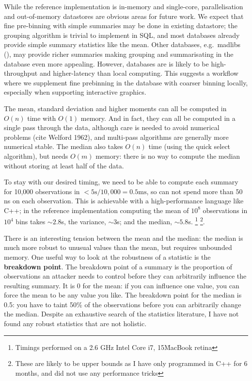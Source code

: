 \documentclass[journal]{vgtc}                %
\begin{document}
While the reference implementation is in-memory and single-core, parallelisation and out-of-memory datastores are obvious areas for  future work. We expect that fine pre-binning with simple summaries may be done in existing datastore; the grouping algorithm is trivial to implement in SQL, and most databases already provide simple summary statistics like the mean. Other databases, e.g.\ madlibs (), may provide richer summaries making grouping and summarisating in the database even more appealing. However, databases are is likely to be high-throughput and higher-latency than local computing. This suggests a workflow where we supplement fine prebinning in the database with coarser binning locally, especially when supporting interactive graphics.

The mean, standard deviation and higher moments can all be computed in $O(n)$ time with $O(1)$ memory. And in fact, they can all be computed in a single pass through the data, although care is needed to avoid numerical problems (cite Welford 1962), and multi-pass algorithms are generally more numerical stable. The median also takes $O(n)$ time (using the quick select algorithm), but needs $O(m)$ memory: there is no way to compute the median without storing at least half of the data.

To stay with our desired timing, we need to be able to compute each summary for 10,000 observations in $< 5 \mbox{s} / 10,000 = 0.5 \mbox{ms}$, so can not spend more than 50 ns on each observation. This is achievable with a high-performance language like C++; in the reference implementation computing the mean of $10^8$ observations in $10^4$ bins takes $\sim 2.8$s, the variance, $\sim 3$s; and the median, $\sim 5.8$s. \footnote{Timings performed on a 2.6 GHz Intel Core i7, 15\" MacBook retina} \footnote{These are likely to be upper bounds as I have only programmed in C++ for 6 months, and did not use any performance tricks}.  

There is an interesting tension between the mean and the median: the median is much more robust to unusual values than the mean, but requires unbounded memory. One useful way to look at the robustness of a statistic is the {\bf breakdown point}.  The breakdown point of a summary is the proportion of observations an attacker needs to control before they can arbitrarily influence the resulting summary. It is 0 for the mean: if you can influence one value, you can force the mean to be any value you like. The breakdown point for the median is 0.5: you have to taint 50\% of the observations before you can arbitrarily change the median.  Despite an exhaustive search of the statistics literature, I have not found any robust statistics that are not holistic.
\end{document}
